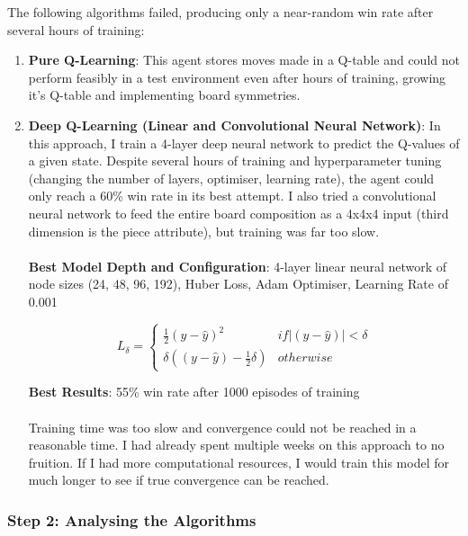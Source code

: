 The following algorithms failed, producing only a near-random win rate after several hours of training:

\begin{enumerate}
    \item \textbf{Pure Q-Learning}: This agent stores moves made in a Q-table and could not perform feasibly in a test environment even after hours of training, growing it's Q-table and implementing board symmetries.
    \item \textbf{Deep Q-Learning (Linear and Convolutional Neural Network)}: In this approach, I train a 4-layer deep neural network to predict the Q-values of a given state. Despite several hours of training and hyperparameter tuning (changing the number of layers, optimiser, learning rate), the agent could only reach a 60\% win rate in its best attempt. I also tried a convolutional neural network to feed the entire board composition as a 4x4x4 input (third dimension is the piece attribute), but training was far too slow.  \\ \\
    \textbf{Best Model Depth and Configuration}: 4-layer linear neural network of node sizes (24, 48, 96, 192), Huber Loss, Adam Optimiser, Learning Rate of 0.001

    \begin{equation*}
        L_{\delta}=
    \left\{\begin{matrix}
        \frac{1}{2}(y - \hat{y})^{2} & if \left | (y - \hat{y})  \right | < \delta\\
        \delta ((y - \hat{y}) - \frac1 2 \delta) & otherwise
    \end{matrix}\right.
    \end{equation*}

    \textbf{Best Results}: 55\% win rate after 1000 episodes of training \\ \\
    Training time was too slow and convergence could not be reached in a reasonable time. I had already spent multiple weeks on this approach to no fruition. If I had more computational resources, I would train this model for much longer to see if true convergence can be reached.
\end{enumerate}

\subsubsection{Step 2: Analysing the Algorithms}

